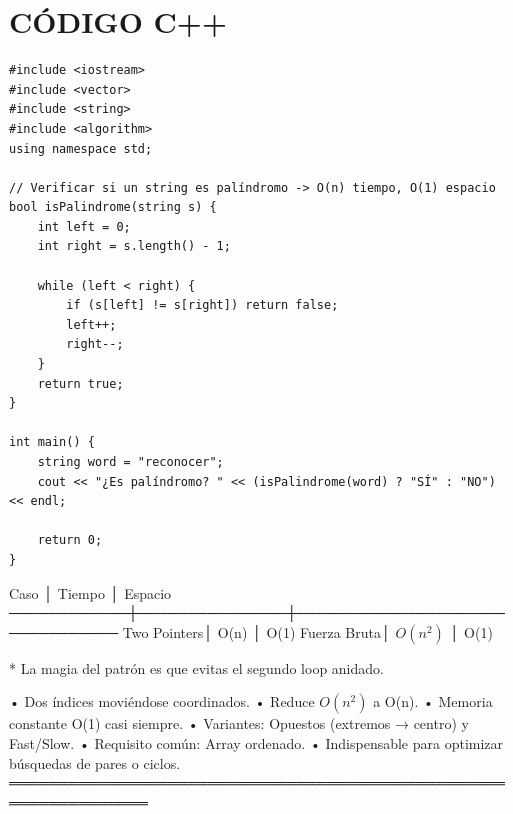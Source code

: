 \section*{CÓDIGO C++}
\hrulefill
\begin{lstlisting}
#include <iostream>
#include <vector>
#include <string>
#include <algorithm>
using namespace std;

// Verificar si un string es palíndromo -> O(n) tiempo, O(1) espacio
bool isPalindrome(string s) {
    int left = 0;
    int right = s.length() - 1;

    while (left < right) {
        if (s[left] != s[right]) return false;
        left++;
        right--;
    }
    return true;
}

int main() {
    string word = "reconocer";
    cout << "¿Es palíndromo? " << (isPalindrome(word) ? "SÍ" : "NO") << endl;
    
    return 0;
}
\end{lstlisting}
\begin{dsacomplejidad}
Caso        │ Tiempo        │ Espacio
  ────────────┼───────────────┼────────────────────────────────
  Two Pointers│ O(n)          │ O(1)
  Fuerza Bruta│ $O(n^2)$         │ O(1)

* La magia del patrón es que evitas el segundo loop anidado.
\end{dsacomplejidad}
\begin{dsaentrevistas}

\end{dsaentrevistas}
\begin{dsaresumen}
• Dos índices moviéndose coordinados.
• Reduce $O(n^2)$ a O(n).
• Memoria constante O(1) casi siempre.
• Variantes: Opuestos (extremos → centro) y Fast/Slow.
• Requisito común: Array ordenado.
• Indispensable para optimizar búsquedas de pares o ciclos.
════════════════════════════════════════════════════════════════
\end{dsaresumen}


